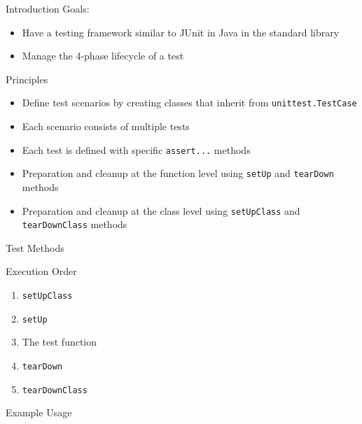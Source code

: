 \begin{frame}{Introduction}
  Goals:
  \begin{itemize}[<+->]
  \item Have a testing framework similar to JUnit in Java in the standard library
  \item Manage the 4-phase lifecycle of a test
  \end{itemize}
  \end{frame}
  
  \begin{frame}{Principles}
  \begin{itemize}[<+->]
  \item Define test scenarios by creating classes that inherit from \texttt{unittest.TestCase}
  \item Each scenario consists of multiple tests
  \item Each test is defined with specific \texttt{assert...} methods
  \item Preparation and cleanup at the function level using \texttt{setUp} and \texttt{tearDown} methods
  \item Preparation and cleanup at the class level using \texttt{setUpClass} and \texttt{tearDownClass} methods
  \end{itemize}
  \end{frame}
  
  \begin{frame}{Test Methods}
  \end{frame}
  
  \begin{frame}{Execution Order}
  
  \begin{enumerate}[<+->]
  \item \texttt{setUpClass}
  \item \texttt{setUp}
  \item The test function
  \item \texttt{tearDown}
  \item \texttt{tearDownClass}
  \end{enumerate}
  
  \end{frame}
  
  \begin{frame}{Example Usage}
  \end{frame}
  
